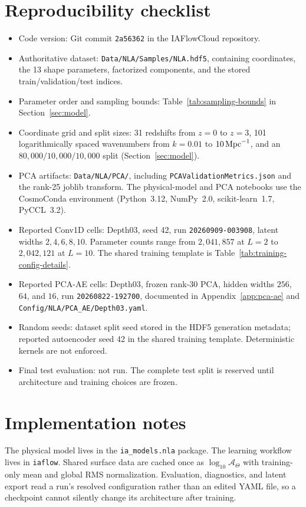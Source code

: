 \section{Reproducibility checklist}
\label{app:reproducibility}

\begin{itemize}
  \item Code version: Git commit \texttt{2a56362} in the IAFlowCloud
        repository.
  \item Authoritative dataset: \texttt{Data/NLA/Samples/NLA.hdf5}, containing
        coordinates, the 13 shape parameters, factorized components, and the
        stored train/validation/test indices.
  \item Parameter order and sampling bounds:
        Table~\ref{tab:sampling-bounds} in Section~\ref{sec:model}.
  \item Coordinate grid and split sizes: 31 redshifts from $z=0$ to $z=3$,
        101 logarithmically spaced wavenumbers from
        $k=0.01$ to $10\,{\rm Mpc}^{-1}$, and an $80{,}000/10{,}000/10{,}000$
        split (Section~\ref{sec:model}).
  \item PCA artifacts: \texttt{Data/NLA/PCA/}, including
        \texttt{PCAValidationMetrics.json} and the rank-25 joblib transform.
        The physical-model and PCA notebooks use the CosmoConda environment
        (Python~3.12, NumPy~2.0, scikit-learn~1.7, PyCCL~3.2).
  \item Reported Conv1D cells: Depth03, seed 42, run
        \texttt{20260909-003908}, latent widths $2,4,6,8,10$.
        Parameter counts range from $2{,}041{,}857$ at $L=2$ to
        $2{,}042{,}121$ at $L=10$.  The shared training template is
        Table~\ref{tab:training-config-details}.
  \item Reported PCA-AE cells: Depth03, frozen rank-30 PCA, hidden widths
        $256$, $64$, and $16$, run \texttt{20260822-192700}, documented in
        Appendix~\ref{app:pca-ae} and
        \texttt{Config/NLA/PCA\_AE/Depth03.yaml}.
  \item Random seeds: dataset split seed stored in the HDF5 generation
        metadata; reported autoencoder seed 42 in the shared training
        template.  Deterministic kernels are not enforced.
  \item Final test evaluation: not run.  The complete test split is reserved
        until architecture and training choices are frozen.
\end{itemize}

\section{Implementation notes}

The physical model lives in the \texttt{ia\_models.nla} package.  The learning
workflow lives in \texttt{iaflow}.  Shared surface data are cached once as
$\log_{10}\mathcal A_\Theta$ with training-only mean and global RMS
normalization.  Evaluation, diagnostics, and latent export read a run's
resolved configuration rather than an edited YAML file, so a checkpoint cannot
silently change its architecture after training.
